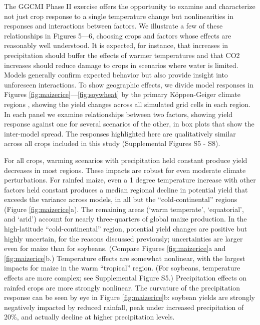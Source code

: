 \documentclass[gmd, manuscript]{copernicus} %
\begin{document}
The GGCMI Phase II exercise offers the opportunity to examine and characterize not just crop response to a single temperature change but nonlinearities in responses and interactions between factors. 
We illustrate a few of these relationships in Figures 5—6, choosing crops and factors whose effects are reasonably well understood. 
It is expected, for instance, that increases in precipitation should buffer the effects of warmer temperatures and that CO2 increases should reduce damage to crops in scenarios where water is limited. 
Models generally confirm expected behavior but also provide insight into unforeseen interactions. 
To show geographic effects, we divide model responses in Figures \ref{fig:maizerice}—\ref{fig:soywheat} by the primary K\"{o}ppen-Geiger climate regions \citep{rubel2010}, showing the yield changes across all simulated grid cells in each region. 
In each panel we examine relationships between two factors, showing yield response against one for several scenarios of the other, in box plots that show the inter-model spread. 
The responses highlighted here are qualitatively similar across all crops included in this study (Supplemental Figures S5 - S8). 

For all crops, warming scenarios with precipitation held constant produce yield decreases in most regions. 
These impacts are robust for even moderate climate perturbations. For rainfed maize, even a 1 degree temperature increase with other factors held constant produces a median regional decline in potential yield that exceeds the variance across models, in all but the ``cold-continental'' regions (Figure \ref{fig:maizerice}a). 
The remaining areas (‘warm temperate’, ‘equatorial’, and ‘arid’) account for nearly three-quarters of global maize production. In the high-latitude ``cold-continental'' region, potential yield changes are positive but highly uncertain, for the reasons discussed previously; uncertainties are larger even for maize than for soybeans. 
(Compare Figures \ref{fig:maizerice}a and \ref{fig:maizerice}b.) 
Temperature effects are somewhat nonlinear, with the largest impacts for maize in the warm ``tropical'' region. 
(For soybeans, temperature effects are more complex; see Supplemental Figure S5.) 
Precipitation effects on rainfed crops are more strongly nonlinear. 
The curvature of the precipitation response can be seen by eye in Figure \ref{fig:maizerice}b: soybean yields are strongly negatively impacted by reduced rainfall, peak under increased precipitation of 20\%, and actually decline at higher precipitation levels. 
\end{document}
